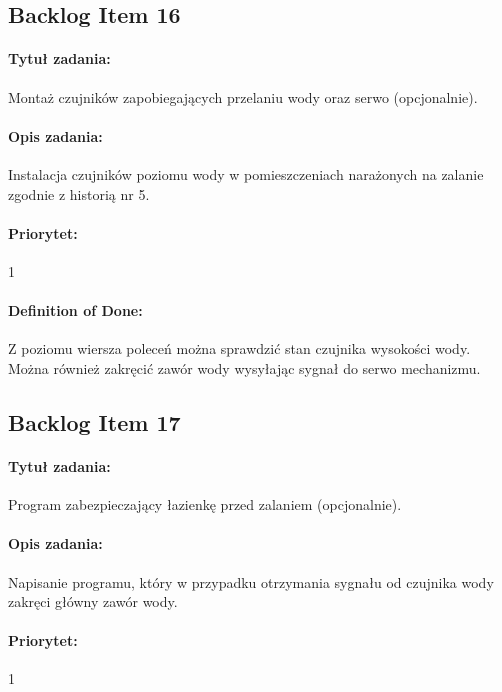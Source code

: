 	
	\subsection{Backlog Item 16}
	\paragraph{Tytuł zadania:}
	Montaż czujników zapobiegających przelaniu wody oraz serwo (opcjonalnie).
	
	\paragraph{Opis zadania:} 
	Instalacja czujników poziomu wody w pomieszczeniach narażonych na zalanie zgodnie z historią nr 5.
	
	\paragraph{Priorytet:} 
	1
	
	\paragraph{Definition of Done:}
	Z poziomu wiersza poleceń można sprawdzić stan czujnika wysokości wody. Można również zakręcić zawór wody wysyłając sygnał do serwo mechanizmu.


	\subsection{Backlog Item 17}
	\paragraph{Tytuł zadania:}
	Program zabezpieczający łazienkę przed zalaniem (opcjonalnie).
	
	\paragraph{Opis zadania:} 
	Napisanie programu, który w przypadku otrzymania sygnału od czujnika wody zakręci główny zawór wody. 
	
	\paragraph{Priorytet:} 
	1
	
